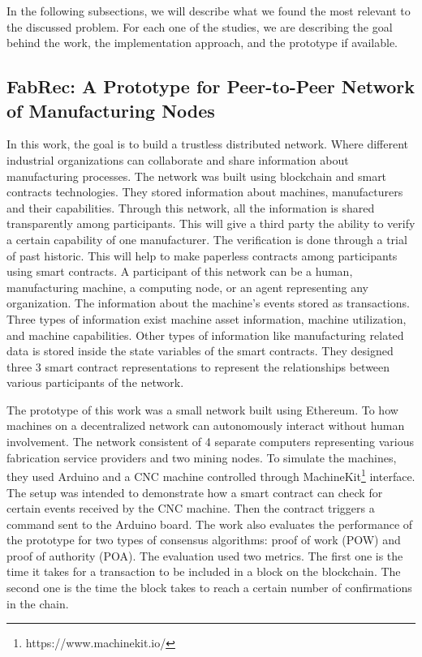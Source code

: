 \documentclass[runningheads]{llncs}
\begin{document}
\noindent
In the following subsections, we will describe what we found the most relevant to the discussed problem. For each one of the studies, we are describing the goal behind the work, the implementation approach, and the prototype if available. 

\subsection{FabRec: A Prototype for Peer-to-Peer Network of Manufacturing Nodes \cite{Angrish2018a}}

In this work, the goal is to build a trustless distributed network. Where different industrial organizations can collaborate and share information about manufacturing processes. The network was built using blockchain and smart contracts technologies. They stored information about machines, manufacturers and their capabilities. Through this network, all the information is shared transparently among participants. This will give a third party the ability to verify a certain capability of one manufacturer. The verification is done through a trial of past historic. This will help to make paperless contracts among participants using smart contracts. A participant of this network can be a human, manufacturing machine, a computing node, or an agent representing any organization. The information about the machine's events stored as transactions. Three types of information exist machine asset information, machine utilization, and machine capabilities. Other types of information like manufacturing related data is stored inside the state variables of the smart contracts.  They designed three 3 smart contract representations to represent the relationships between various participants of the network.
\bigbreak

\noindent
The prototype of this work was a small network built using Ethereum. To how machines on a decentralized network can autonomously interact without human involvement. The network consistent of 4 separate computers representing various fabrication service providers and two mining nodes. To simulate the machines, they used Arduino and a CNC machine controlled through MachineKit\footnote{https://www.machinekit.io/} interface. The setup was intended to demonstrate how a smart contract can check for certain events received by the CNC machine. Then the contract triggers a command sent to the Arduino board. The work also evaluates the performance of the prototype for two types of consensus algorithms: proof of work (POW) and proof of authority (POA). The evaluation used two metrics. The first one is the time it takes for a transaction to be included in a block on the blockchain. The second one is the time the block takes to reach a certain number of confirmations in the chain.
\bigbreak
\end{document}
